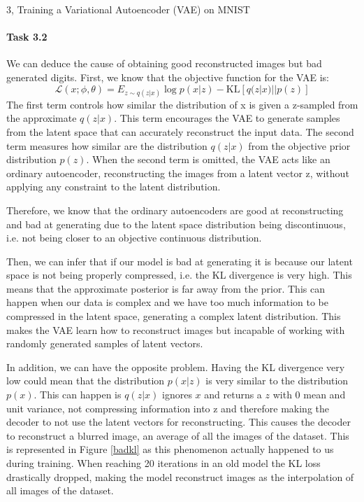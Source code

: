 \begin{task}{3, Training a Variational Autoencoder (VAE) on MNIST}
\paragraph{Task 3.2} We can deduce the cause of obtaining good reconstructed images but bad generated digits. First, we know that the objective function for the VAE is:
\[
\mathcal{L}(x;\phi, \theta) = E_{z\sim q(z|x)}\log p(x|z) - \text{KL}[q(z|x)||p(z)]
\]
The first term controls how similar the distribution of x is given a z-sampled from the approximate \(q(z|x)\). This term encourages the VAE to generate samples from the latent space that can accurately reconstruct the input data. The second term measures how similar are the distribution \(q(z|x)\) from the objective prior distribution \(p(z)\). When the second term is omitted, the VAE acts like an ordinary autoencoder, reconstructing the images from a latent vector z, without applying any constraint to the latent distribution. 

Therefore, we know that the ordinary autoencoders are good at reconstructing and bad at generating due to the latent space distribution being discontinuous, i.e. not being closer to an objective continuous distribution.

Then, we can infer that if our model is bad at generating it is because our latent space is not being properly compressed, i.e. the KL divergence is very high. This means that the approximate posterior is far away from the prior. This can happen when our data is complex and we have too much information to be compressed in the latent space, generating a complex latent distribution. This makes the VAE learn how to reconstruct images but incapable of working with randomly generated samples of latent vectors.

In addition, we can have the opposite problem. Having the KL divergence very low could mean that the distribution \(p(x|z)\) is very similar to the distribution \(p(x)\). This can happen is \(q(z|x)\) ignores \(x\) and returns a \(z\) with 0 mean and unit variance, not compressing information into z and therefore making the decoder to not use the latent vectors for reconstructing. This causes the decoder to reconstruct a blurred image, an average of all the images of the dataset. This is represented in Figure \ref{badkl} as this phenomenon actually happened to us during training. When reaching 20 iterations in an old model the KL loss drastically dropped, making the model reconstruct images as the interpolation of all images of the dataset.


\end{task}
